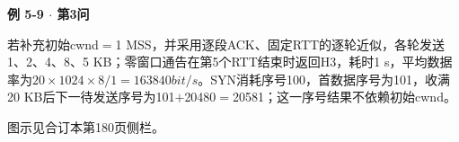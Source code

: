 {\color{ink}\bfseries 例 5-9 \(\cdot \) 第3问}\par\vspace{1bp}若补充初始cwnd\(=\allowbreak{}\)1 MSS，并采用逐段ACK、固定RTT的逐轮近似，各轮发送1、2、4、8、5 KB；零窗口通告在第5个RTT结束时返回H3，耗时1 s，平均数据率为\(20\times 1024\times 8/\allowbreak{}1=\allowbreak{}163840 bit/\allowbreak{}s\)。SYN消耗序号100，首数据序号为101，收满20 KB后下一待发送序号为101\(+\allowbreak{}\)20480\(=\allowbreak{}\)20581；这一序号结果不依赖初始cwnd。\par {\color{ink}图示见合订本第180页侧栏。}
